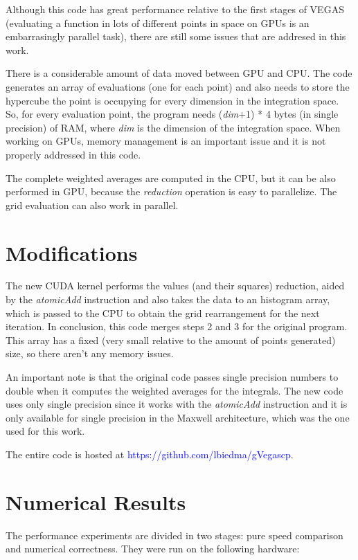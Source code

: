 \documentclass[english]{maciarticle}
\begin{document}
Although this code has great performance relative to the first stages of VEGAS (evaluating a function in lots of different points in space on GPUs is an embarrasingly parallel task), there are still some issues that are addresed in this work.

There is a considerable amount of data moved between GPU and CPU. The code generates an array of evaluations (one for each point) and also needs to store the hypercube the point is occupying for every dimension in the integration space. So, for every evaluation point, the program needs (\textit{dim}+1) * 4 bytes (in single precision) of RAM, where \textit{dim} is the dimension of the integration space. When working on GPUs, memory management is an important issue and it is not properly addressed in this code.

The complete weighted averages are computed in the CPU, but it can be also performed in GPU, because the \textit{reduction} operation is easy to parallelize. The grid evaluation can also work in parallel.

\section{Modifications}

The new CUDA kernel performs the values (and their squares) reduction, aided by the \textit{atomicAdd} instruction\cite{cudaprog} and also takes the data to an histogram array, which is passed to the CPU to obtain the grid rearrangement for the next iteration. In conclusion, this code merges steps 2 and 3 for the original program.
This array has a fixed (very small relative to the amount of points generated) size,
so there aren't any memory issues.

An important note is that the original code passes single precision numbers to double when it computes the weighted averages for the integrals. The new code uses only single precision since it works with the \textit{atomicAdd} instruction and it is only available for single precision in the Maxwell architecture, which was the one used for this work.

The entire code is hosted at \textcolor{blue}{https://github.com/lbiedma/gVegascp}.

\section{Numerical Results}

The performance experiments are divided in two stages: pure speed comparison and numerical correctness. They were run on the following hardware:
\end{document}

